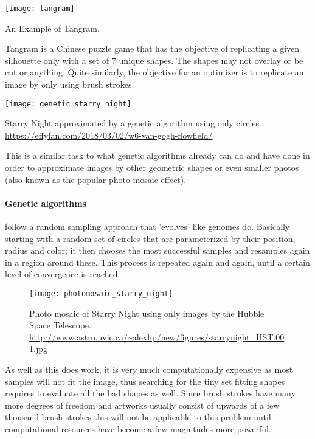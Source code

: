 \begin{marginfigure}
    \texttt{[image: tangram]}
    \caption[]{An Example of Tangram.}
\end{marginfigure}

Tangram is a Chinese puzzle game that has the objective of replicating a given silhouette
only with a set of 7 unique shapes.
The shapes may not overlay or be cut or anything.
Quite similarly, the objective for an optimizer is to replicate an image by only
using brush strokes.

\begin{marginfigure}
    \texttt{[image: genetic\_starry\_night]}
    \caption[]{Starry Night approximated by a genetic algorithm using only circles. \url{https://effyfan.com/2018/03/02/w6-van-gogh-flowfield/}}
\end{marginfigure}


This is a similar task to what genetic algorithms already can do and have done in
order to approximate images by other geometric shapes or even smaller photos (also 
known as the popular photo mosaic effect).
\paragraph{Genetic algorithms} follow a random sampling approach that 'evolves' like genomes do.
Basically starting with a random set of circles that are parameterized by their position,
radius and color; it then chooses the most successful samples and resamples again
in a region around these.
This process is repeated again and again, until a certain level of convergence is reached.

\begin{figure}
    \texttt{[image: photomosaic\_starry\_night]}
    \caption[]{Photo mosaic of Starry Night using only images by the Hubble Space Telescope. \url{http://www.astro.uvic.ca/~alexhp/new/figures/starrynight_HST.001.jpg}}
\end{figure}


As well as this does work, it is very much computationally expensive as most samples
will not fit the image, thus searching for the tiny set fitting shapes requires
to evaluate all the bad shapes as well.
Since brush strokes have many more degrees of freedom and artworks usually consist
of upwards of a few thousand brush strokes this will not be applicable to this problem
until computational resources have become a few magnitudes more powerful.

